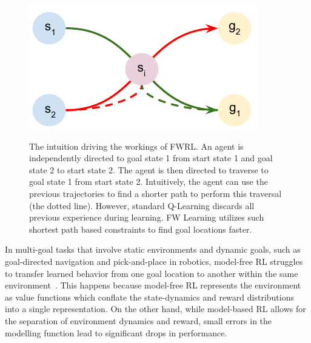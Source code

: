 \begin{figure}%
\includegraphics[width=\columnwidth]{./media/optimal_trajectories.pdf}\\
\caption{The intuition driving the workings of FWRL. An agent is
independently directed to goal state 1 from start state 1 and goal state
2 to start state 2. The agent is then directed to traverse to goal state
1 from start state 2. Intuitively, the agent can use the previous
trajectories to find a shorter path to perform this traversal (the
dotted line). However, standard Q-Learning discards all previous
experience during learning. FW Learning utilizes such shortest path
based constraints to find goal locations faster.  }
\label{fig:ql-fw-grid-world-results}%
\end{figure}

In multi-goal tasks that involve static environments and dynamic goals,
such as goal-directed navigation and pick-and-place in robotics,
model-free RL struggles to transfer learned behavior from one goal
location to another within the same
environment~\citep{dhiman2018critical}. This happens because model-free
RL represents the environment as value functions which conflate the
state-dynamics and reward distributions into a single representation.
On the other hand, while model-based RL allows for the separation of
environment dynamics and reward, small errors in the modelling function
lead to significant drops in performance.

